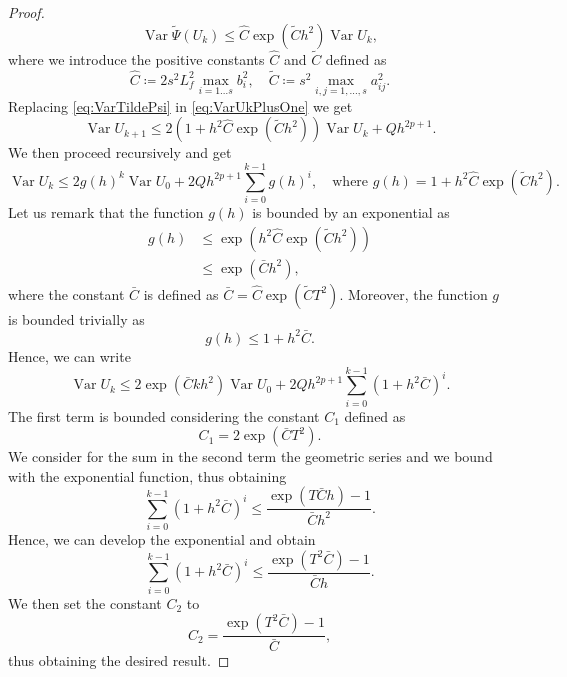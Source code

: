 \documentclass{siamart1116}
\numberwithin{theorem}{section}
\newcommand{\defeq}{\coloneqq}
\newcommand{\Var}{\operatorname{Var}}
\newcommand{\sksum}{\textstyle\sum}
\begin{document}
\begin{proof}
\begin{equation}
		\Var \tilde \Psi (U_k) \leq \hat C \exp(\tilde C h^2)\Var U_k,
 	\end{equation}
 	where we introduce the positive constants $\hat C$ and $\tilde C$ defined as
 	\begin{equation}
	 	\hat C \defeq  2s^2 L_f^2\max_{i=1\ldots s}b_i^2, \quad \tilde C \defeq s^2 \max_{i,j=1,\ldots,s}a_{ij}^2.
 	\end{equation}
 	Replacing \eqref{eq:VarTildePsi} in \eqref{eq:VarUkPlusOne} we get
 	\begin{equation}
 		\Var U_{k+1} \leq 2(1 +  h^2\hat C \exp(\tilde C h^2))\Var U_k + Q h^{2p + 1}.
	\end{equation}
	{\color{red}We then proceed recursively and get}
	\begin{equation}
		\Var U_{k} \leq 2g(h)^k \Var U_0 + 2Qh^{2p + 1}\sksum_{i=0}^{k-1}g(h)^i, \quad \text{where } g(h) = 1 +  h^2\hat C \exp(\tilde C h^2).
 	\end{equation}
	Let us remark that the function $g(h)$ is bounded by an exponential as
	\begin{equation}
	\begin{aligned}
		g(h) &\leq \exp(h^2\hat C \exp(\tilde C h^2))\\
		&\leq \exp(\bar Ch^2),
	\end{aligned}
	\end{equation}	
	where the constant $\bar C$ is defined as $\bar C = \hat C \exp(\tilde C T^2)$. Moreover, the function $g$ is bounded trivially as 
	\begin{equation}
		g(h) \leq 1 + h^2\bar C.
	\end{equation} 
	Hence, we can write
	\begin{equation}
		\Var U_{k} \leq 2\exp(\bar C k h^2) \Var U_0 + 2Qh^{2p + 1}\sksum_{i=0}^{k-1}(1 + h^2 \bar C)^i.
	\end{equation}
	The first term is bounded considering the constant $C_1$ defined as
	\begin{equation}
		C_1 = 2\exp(\bar C T^2).
	\end{equation}
	We consider for the sum in the second term the geometric series and we bound with the exponential function, thus obtaining
	\begin{equation}
		\sksum_{i=0}^{k-1}(1 + h^2 \bar C)^i \leq \dfrac{\exp(T\bar C h) - 1}{\bar C h^2}.
	\end{equation}
	Hence, we can develop the exponential and obtain
	\begin{equation}\label{eq:BoundOfSum}
		\sksum_{i=0}^{k-1}(1 + h^2 \bar C)^i \leq \dfrac{\exp(T^2\bar C) - 1}{\bar Ch}.
	\end{equation}
	We then set the constant $C_2$ to
	\begin{equation}
		C_2 = \frac{\exp(T^2\bar C) - 1}{\bar C},
	\end{equation}
	thus obtaining the desired result.
\end{proof}
\end{document}
